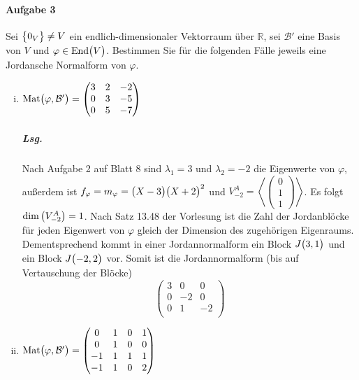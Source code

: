 \documentclass{scrreprt}
\newcommand\End{\text{End}}
\newcommand\Mat{\text{Mat}}
\begin{document}
\paragraph{Aufgabe 3} Sei $\qty\big{0_V} \ne V$ ein endlich-dimensionaler
Vektorraum über $\mathbb{R}$, sei $\mathcal{B}'$ eine Basis von $V$ und
$\varphi \in \End\qty\big(V)$.
Bestimmen Sie für die folgenden Fälle jeweils eine Jordansche Normalform von
$\varphi$.
\begin{enumerate}[(i)]
\item $\Mat\qty\big(\varphi, \mathcal{B}') = \begin{pmatrix}
    3 & 2 & -2 \\
    0 & 3 & -5 \\
    0 & 5 & -7 \\
  \end{pmatrix}$

  \subparagraph{Lsg.} Nach Aufgabe 2 auf Blatt 8 sind $\lambda_1 = 3$ und
  $\lambda_2 = -2$ die Eigenwerte von $\varphi$, außerdem ist
  $f_{\varphi} = m_{\varphi} = \qty\big(X - 3)\qty\big(X + 2)^2$ und
  $V_{-2}^A = \left\langle \begin{pmatrix}0\\1\\1\end{pmatrix} \right\rangle$.
  Es folgt $\dim\qty\big(V_{-2}^A) = 1$.
  Nach Satz 13.48 der Vorlesung ist die Zahl der Jordanblöcke für jeden
  Eigenwert von $\varphi$ gleich der Dimension des zugehörigen Eigenraums.
  Dementsprechend kommt in einer Jordannormalform ein Block $J\qty\big(3, 1)$
  und ein Block $J\qty\big(-2, 2)$ vor.
  Somit ist die Jordannormalform (bis auf Vertauschung der Blöcke)
  \[
    \begin{pmatrix}
      3 &  0 &  0 \\
      0 & -2 &  0 \\
      0 &  1 & -2 \\
    \end{pmatrix}
  \]

\item $\Mat\qty\big(\varphi, \mathcal{B}') = \begin{pmatrix}
     0 & 1 & 0 & 1 \\
     0 & 1 & 0 & 0 \\
    -1 & 1 & 1 & 1 \\
    -1 & 1 & 0 & 2 \\
  \end{pmatrix}$


\end{enumerate}
\end{document}
